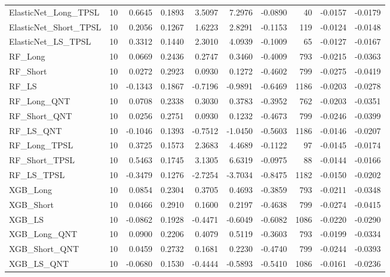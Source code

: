 \begin{tabular}{llrrrrrrrr}
\cline{1-10}
ElasticNet\_Long\_TPSL & 10 & 0.6645 & 0.1893 & 3.5097 & 7.2976 & -0.0890 & 40 & -0.0157 & -0.0179 \\
\cline{1-10}
ElasticNet\_Short\_TPSL & 10 & 0.2056 & 0.1267 & 1.6223 & 2.8291 & -0.1153 & 119 & -0.0124 & -0.0148 \\
\cline{1-10}
ElasticNet\_LS\_TPSL & 10 & 0.3312 & 0.1440 & 2.3010 & 4.0939 & -0.1009 & 65 & -0.0127 & -0.0167 \\
\cline{1-10}
RF\_Long & 10 & 0.0669 & 0.2436 & 0.2747 & 0.3460 & -0.4009 & 793 & -0.0215 & -0.0363 \\
\cline{1-10}
RF\_Short & 10 & 0.0272 & 0.2923 & 0.0930 & 0.1272 & -0.4602 & 799 & -0.0275 & -0.0419 \\
\cline{1-10}
RF\_LS & 10 & -0.1343 & 0.1867 & -0.7196 & -0.9891 & -0.6469 & 1186 & -0.0203 & -0.0278 \\
\cline{1-10}
RF\_Long\_QNT & 10 & 0.0708 & 0.2338 & 0.3030 & 0.3783 & -0.3952 & 762 & -0.0203 & -0.0351 \\
\cline{1-10}
RF\_Short\_QNT & 10 & 0.0256 & 0.2751 & 0.0930 & 0.1232 & -0.4673 & 799 & -0.0246 & -0.0399 \\
\cline{1-10}
RF\_LS\_QNT & 10 & -0.1046 & 0.1393 & -0.7512 & -1.0450 & -0.5603 & 1186 & -0.0146 & -0.0207 \\
\cline{1-10}
RF\_Long\_TPSL & 10 & 0.3725 & 0.1573 & 2.3683 & 4.4689 & -0.1122 & 97 & -0.0145 & -0.0174 \\
\cline{1-10}
RF\_Short\_TPSL & 10 & 0.5463 & 0.1745 & 3.1305 & 6.6319 & -0.0975 & 88 & -0.0144 & -0.0166 \\
\cline{1-10}
RF\_LS\_TPSL & 10 & -0.3479 & 0.1276 & -2.7254 & -3.7034 & -0.8475 & 1182 & -0.0150 & -0.0202 \\
\cline{1-10}
XGB\_Long & 10 & 0.0854 & 0.2304 & 0.3705 & 0.4693 & -0.3859 & 793 & -0.0211 & -0.0348 \\
\cline{1-10}
XGB\_Short & 10 & 0.0466 & 0.2910 & 0.1600 & 0.2197 & -0.4638 & 799 & -0.0274 & -0.0415 \\
\cline{1-10}
XGB\_LS & 10 & -0.0862 & 0.1928 & -0.4471 & -0.6049 & -0.6082 & 1086 & -0.0220 & -0.0290 \\
\cline{1-10}
XGB\_Long\_QNT & 10 & 0.0900 & 0.2206 & 0.4079 & 0.5119 & -0.3603 & 793 & -0.0199 & -0.0334 \\
\cline{1-10}
XGB\_Short\_QNT & 10 & 0.0459 & 0.2732 & 0.1681 & 0.2230 & -0.4740 & 799 & -0.0244 & -0.0393 \\
\cline{1-10}
XGB\_LS\_QNT & 10 & -0.0680 & 0.1530 & -0.4444 & -0.5893 & -0.5410 & 1086 & -0.0161 & -0.0236 \\

\end{tabular}
